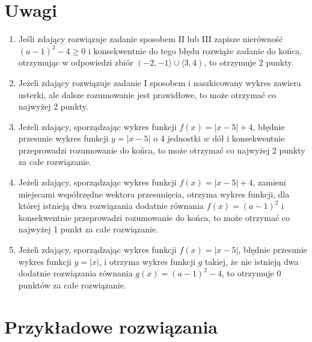 \documentclass[10pt]{article}
\begin{document}
\section*{Uwagi}
\begin{enumerate}
  \item Jeśli zdający rozwiązuje zadanie sposobem II lub III zapisze nierówność $(a-1)^{2}-4 \geq 0$ i konsekwentnie do tego błędu rozwiąże zadanie do końca, otrzymując w odpowiedzi zbiór $(-2,-1\rangle \cup\langle 3,4)$, to otrzymuje 2 punkty.
  \item Jeżeli zdający rozwiązuje zadanie I sposobem i naszkicowany wykres zawiera usterki, ale dalsze rozumowanie jest prawidłowe, to może otrzymać co najwyżej 2 punkty.
  \item Jeżeli zdający, sporządzając wykres funkcji $f(x)=|x-5|+4$, błędnie przesunie wykres funkcji $y=|x-5|$ o 4 jednostki $w$ dół i konsekwentnie przeprowadzi rozumowanie do końca, to może otrzymać co najwyżej 2 punkty za całe rozwiązanie.
  \item Jeżeli zdający, sporządzając wykres funkcji $f(x)=|x-5|+4$, zamieni miejscami współrzędne wektora przesunięcia, otrzyma wykres funkcji, dla której istnieją dwa rozwiązania dodatnie równania $f(x)=(a-1)^{2}$ i konsekwentnie przeprowadzi rozumowanie do końca, to może otrzymać co najwyżej 1 punkt za całe rozwiązanie.
  \item Jeżeli zdający, sporządzając wykres funkcji $f(x)=|x-5|$, błędnie przesunie wykres funkcji $y=|x|$, i otrzyma wykres funkcji $g$ takiej, że nie istnieją dwa dodatnie rozwiązania równania $g(x)=(a-1)^{2}-4$, to otrzymuje 0 punktów za całe rozwiązanie.
\end{enumerate}

\section*{Przykładowe rozwiązania}
\end{document}
